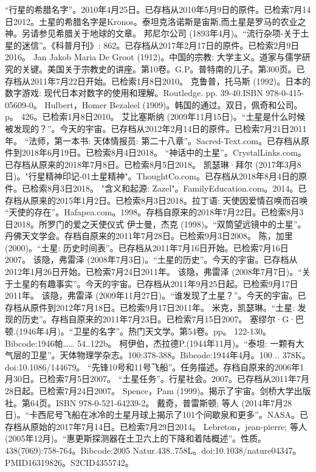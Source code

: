 \begin{enumerate}
 “行星的希腊名字”。2010年4月25日。已存档从2010年5月9日的原件。已检索7月14日2012。土星的希腊名字是Kronos。泰坦克洛诺斯是宙斯,而土星是罗马的农业之神。另请参见希腊关于地球的文章。
 邦尼尔公司 (1893年4月)。“流行杂项-关于土星的迷信”。《科普月刊》: 862。已存档从2017年2月17日的原件。已检索2月9日2016。
 Jan Jakob Maria De Groot (1912)。中国的宗教: 大学主义。道家与儒学研究的关键。美国关于宗教史的讲座。第10卷。G.P。普特南的儿子。第300页。已存档从2011年7月22日开始。已检索1月8日2010。
 克鲁普，托马斯 (1992)。日本的数字游戏: 现代日本对数字的使用和理解。Routledge. pp. 39-40.ISBN 978-0-415-05609-0。
 Hulbert，Homer Bezaleel (1909)。韩国的通过。双日，佩奇和公司。p。 426。已检索1月8日2010。
 艾比塞斯纳 (2009年11月15日)。“土星是什么时候被发现的？”。今天的宇宙。已存档从2012年2月14日的原件。已检索7月21日2011年。
 “法师，第一本书: 天体情报员: 第二十八章”。Sacred-Text.com。已存档从原件到2018年6月19日。已检索8月4日2018。
 “神话中的土星”。CrystalLinks.com。已存档从原来的2018年7月8日。已检索8月5日2018。
 凯瑟琳·拜尔 (2017年3月8日)。"行星精神印记-01土星精神"。ThoughtCo.com。已存档从2018年8月4日的原件。已检索8月3日2018。
 "含义和起源: Zazel"。FamilyEducation.com。2014。已存档从原来的2015年1月2日。已检索8月3日2018。拉丁语: 天使因爱情召唤而召唤
 “天使的存在”。Hafapea.com。1998。存档自原来的2018年7月22日。已检索8月3日2018。所罗门的爱之天使仪式
 伊士曼，杰克 (1998)。“双筒望远镜中的土星”。丹佛天文学会。存档自原来的2011年7月28日。已检索9月3日2008。
 陈，加里 (2000)。“土星: 历史时间表”。已存档从2011年7月16日开始。已检索7月16日2007。
 该隐，弗雷泽 (2008年7月3日)。“土星的历史”。今天的宇宙。已存档从2012年1月26日开始。已检索7月24日2011年。
 该隐，弗雷泽 (2008年7月7日)。“关于土星的有趣事实”。今天的宇宙。已存档从2011年9月25日起。已检索9月17日2011年。
 该隐，弗雷泽 (2009年11月27日)。“谁发现了土星？”。今天的宇宙。已存档从原件到2012年7月18日。已检索9月17日2011年。
 米克，凯瑟琳。“土星: 发现的历史”。存档自原来的2011年7月23日。已检索7月15日2007。
 塞缪尔·G·巴顿.(1946年4月)。“卫星的名字”。热门天文学。第54卷。pp。 122-130。Bibcode:1946帕…… 54..122b。
 柯伊伯，杰拉德P.(1944年11月)。“泰坦: 一颗有大气层的卫星”。天体物理学杂志。100:378-388。Bibcode:1944年4月。100 .. 378K。doi:10.1086/144679。
 “先锋10号和11号飞船”。任务描述。存档自原来的2006年1月30日。已检索7月5日2007。
 “土星任务”。行星社会。2007。已存档从2011年7月28日起。已检索7月24日2007。
 Spence，Pam (1999)。揭示了宇宙。剑桥大学出版社。第64页。ISBN 978-0-521-64239-2。
 戴奇，普雷斯顿; 等人 (2014年7月28日)。“卡西尼号飞船在冰冷的土星月球上揭示了101个间歇泉和更多”。NASA。已存档从原始的2017年7月14日。已检索7月29日2014。
 Lebreton，jean-pierre; 等人 (2005年12月)。“惠更斯探测器在土卫六上的下降和着陆概述”。性质。438(7069):758-764。Bibcode:2005 Natur.438..758L。doi:10.1038/nature04347。PMID16319826。S2CID4355742。  

\end{enumerate}
